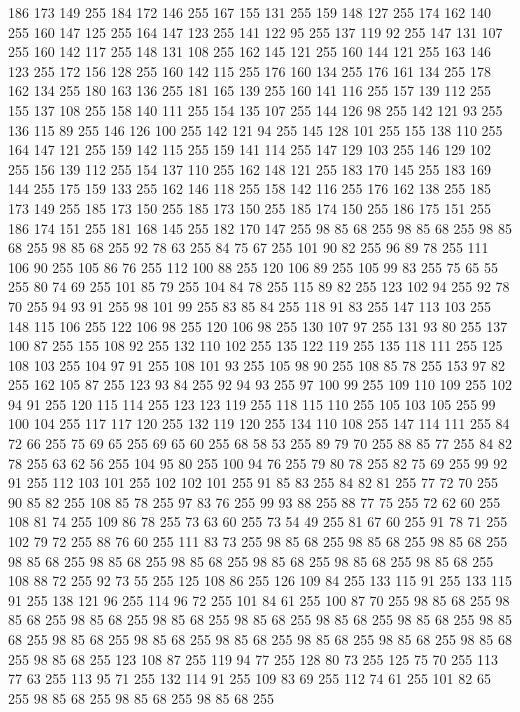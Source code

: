 186 173 149 255 184 172 146 255 167 155 131 255 159 148 127 255 174 162 140 255 160 147 125 255 164 147 123 255 141 122 95 255 137 119 92 255 147 131 107 255 160 142 117 255 148 131 108 255 162 145 121 255 160 144 121 255 163 146 123 255 172 156 128 255 160 142 115 255 176 160 134 255 176 161 134 255 178 162 134 255 180 163 136 255 181 165 139 255 160 141 116 255 157 139 112 255 155 137 108 255 158 140 111 255 154 135 107 255 144 126 98 255 142 121 93 255 136 115 89 255 146 126 100 255 142 121 94 255 145 128 101 255 155 138 110 255 164 147 121 255 159 142 115 255 159 141 114 255 147 129 103 255 146 129 102 255 156 139 112 255 154 137 110 255 162 148 121 255 183 170 145 255 183 169 144 255 175 159 133 255 162 146 118 255 158 142 116 255 176 162 138 255 185 173 149 255 185 173 150 255 185 173 150 255 185 174 150 255 186 175 151 255 186 174 151 255 181 168 145 255 182 170 147 255 98 85 68 255 98 85 68 255 98 85 68 255 98 85 68 255 92 78 63 255 84 75 67 255 101 90 82 255 96 89 78 255
111 106 90 255 105 86 76 255 112 100 88 255 120 106 89 255 105 99 83 255 75 65 55 255 80 74 69 255 101 85 79 255 104 84 78 255 115 89 82 255 123 102 94 255 92 78 70 255 94 93 91 255 98 101 99 255 83 85 84 255 118 91 83 255 147 113 103 255 148 115 106 255 122 106 98 255 120 106 98 255 130 107 97 255 131 93 80 255 137 100 87 255 155 108 92 255 132 110 102 255 135 122 119 255 135 118 111 255 125 108 103 255 104 97 91 255 108 101 93 255 105 98 90 255 108 85 78 255 153 97 82 255 162 105 87 255 123 93 84 255 92 94 93 255 97 100 99 255 109 110 109 255 102 94 91 255 120 115 114 255 123 123 119 255 118 115 110 255 105 103 105 255 99 100 104 255 117 117 120 255 132 119 120 255 134 110 108 255 147 114 111 255 84 72 66 255 75 69 65 255 69 65 60 255 68 58 53 255 89 79 70 255 88 85 77 255 84 82 78 255 63 62 56 255 104 95 80 255 100 94 76 255 79 80 78 255 82 75 69 255 99 92 91 255 112 103 101 255 102 102 101 255 91 85 83 255
84 82 81 255 77 72 70 255 90 85 82 255 108 85 78 255 97 83 76 255 99 93 88 255 88 77 75 255 72 62 60 255 108 81 74 255 109 86 78 255 73 63 60 255 73 54 49 255 81 67 60 255 91 78 71 255 102 79 72 255 88 76 60 255 111 83 73 255 98 85 68 255 98 85 68 255 98 85 68 255 98 85 68 255 98 85 68 255 98 85 68 255 98 85 68 255 98 85 68 255 98 85 68 255 108 88 72 255 92 73 55 255 125 108 86 255 126 109 84 255 133 115 91 255 133 115 91 255 138 121 96 255 114 96 72 255 101 84 61 255 100 87 70 255 98 85 68 255 98 85 68 255 98 85 68 255 98 85 68 255 98 85 68 255 98 85 68 255 98 85 68 255 98 85 68 255 98 85 68 255 98 85 68 255 98 85 68 255 98 85 68 255 98 85 68 255 98 85 68 255 98 85 68 255 123 108 87 255 119 94 77 255 128 80 73 255 125 75 70 255 113 77 63 255 113 95 71 255 132 114 91 255 109 83 69 255 112 74 61 255 101 82 65 255 98 85 68 255 98 85 68 255 98 85 68 255
